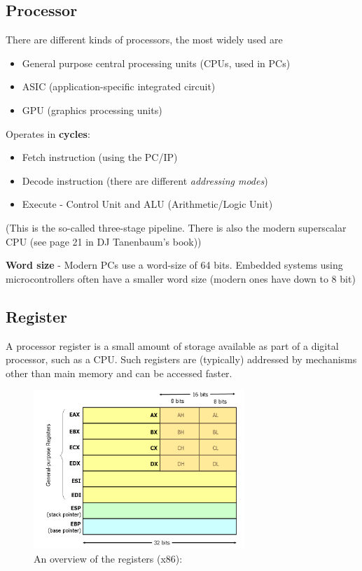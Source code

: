 \documentclass{article}
\begin{document}
\subsection{Processor}
There are different kinds of processors, the most widely used are
\begin{itemize}
	\item General purpose central processing units (CPUs, used in PCs)
	\item ASIC (application-specific integrated circuit)
	\item GPU (graphics processing units)
\end{itemize}

Operates in \textbf{cycles}:
\begin{itemize}
	\item Fetch instruction (using the PC/IP)
	\item Decode instruction (there are different \emph{addressing modes})
	\item Execute - Control Unit and ALU (Arithmetic/Logic Unit)
\end{itemize}
(This is the so-called three-stage pipeline. There is also the modern superscalar CPU (see page 21 in DJ Tanenbaum's book))

\textbf{Word size} - Modern PCs use a word-size of 64 bits. Embedded systems using microcontrollers often have a smaller word size (modern ones have down to 8 bit)

\subsection{Register}
A processor register is a small amount of storage available as part of a digital processor, such as a CPU. Such registers are (typically) addressed by mechanisms other than main memory and can be accessed faster.


\begin{figure}[H]
  \centering
  \includegraphics[width=8.0cm]{images/x86-registers}
  \caption{An overview of the registers (x86): }
\end{figure}
\end{document}
